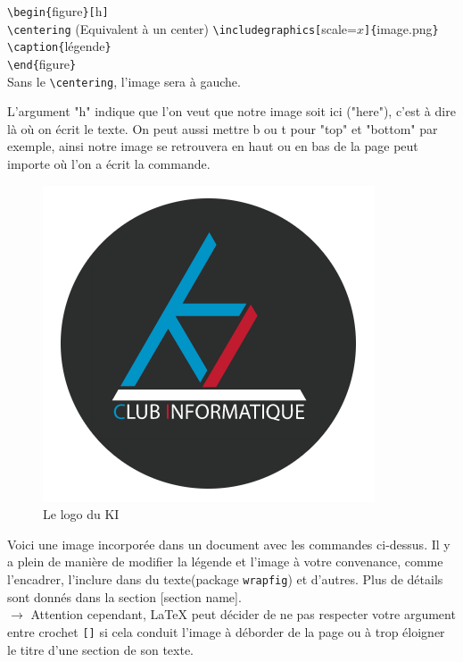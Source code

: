 \documentclass[11pt]{article}				%
\newcommand{\tb}{\textbackslash}
\newcommand{\cmdo}[3][]{\texttt{\textbackslash #2}\texttt{[}#1\texttt{]\{}#3\texttt{\}}}
\newcommand{\cmd}[2]{\texttt{\textbackslash #1}\texttt{\{}#2\texttt{\}}}
\begin{document}
\begin{multicols}{2}
\cmd{begin}{figure}\texttt{[}h\texttt{]}\\
\texttt{\tb centering} \quad (Equivalent à un center)
\cmdo[scale=$x$]{includegraphics}{image.png} \\
\cmd{caption}{légende}\\
\cmd{end}{figure}\\
Sans le \texttt{\tb centering}, l'image sera à gauche. 

\columnbreak

L'argument "h" indique que l'on veut que notre image soit ici ("here"), c'est à dire là où on écrit le texte. On peut aussi mettre b ou t pour "top" et "bottom" par exemple, ainsi notre image se retrouvera en haut ou en bas de la page peut importe où l'on a écrit la commande.
\end{multicols}


\begin{figure}[h!]
	\centering
	\includegraphics[scale=0.2]{ressources/KI.png}
	\caption{Le logo du KI}
\end{figure}



Voici une image incorporée dans un document avec les commandes ci-dessus. Il y a plein de manière de modifier la légende et l'image à votre convenance, comme l'encadrer, l'inclure dans du texte(package \texttt{wrapfig}) et d'autres. Plus de détails sont donnés dans la section [section name].\\


$\rightarrow$ Attention cependant, LaTeX peut décider de ne pas respecter votre argument entre crochet \texttt{[]} si cela conduit l'image à déborder de la page ou à trop éloigner le titre d'une section de son texte.\\
\end{document}

